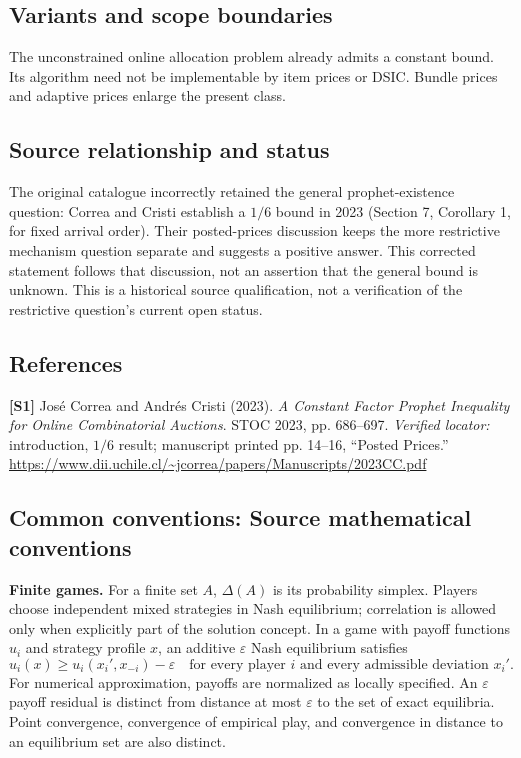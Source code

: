 \documentclass[11pt,a4paper]{article}
\begin{document}
\subsection*{Variants and scope boundaries}
The unconstrained online allocation problem already admits a constant bound. Its algorithm need not be implementable by item prices or DSIC. Bundle prices and adaptive prices enlarge the present class.
\subsection*{Source relationship and status}
The original catalogue incorrectly retained the general prophet-existence question: Correa and Cristi establish a $1/6$ bound in 2023 (Section 7, Corollary 1, for fixed arrival order). Their posted-prices discussion keeps the more restrictive mechanism question separate and suggests a positive answer. This corrected statement follows that discussion, not an assertion that the general bound is unknown. This is a historical source qualification, not a verification of the restrictive question's current open status.
\subsection*{References}
\begingroup\footnotesize\raggedright
\textbf{[S1]} Jos\'e Correa and Andr\'es Cristi (2023). \emph{A Constant Factor Prophet Inequality for Online Combinatorial Auctions}. STOC 2023, pp. 686--697. \textit{Verified locator:} introduction, $1/6$ result; manuscript printed pp. 14--16, ``Posted Prices.'' \url{https://www.dii.uchile.cl/~jcorrea/papers/Manuscripts/2023CC.pdf}
\par\endgroup

\subsection*{Common conventions: Source mathematical conventions}

\textbf{Finite games.} For a finite set $A$, $\Delta(A)$ is its probability
simplex. Players choose independent mixed strategies in Nash equilibrium;
correlation is allowed only when explicitly part of the solution concept.
In a game with payoff functions $u_i$ and strategy profile $x$, an additive
$\varepsilon$ Nash equilibrium satisfies
\[
 u_i(x)\geq u_i(x_i',x_{-i})-\varepsilon
 \quad\text{for every player $i$ and every admissible deviation $x_i'$}.
\]
For numerical approximation, payoffs are normalized as locally specified.
An $\varepsilon$ payoff residual is distinct from distance at most
$\varepsilon$ to the set of exact equilibria. Point convergence, convergence
of empirical play, and convergence in distance to an equilibrium set are
also distinct.
\end{document}
